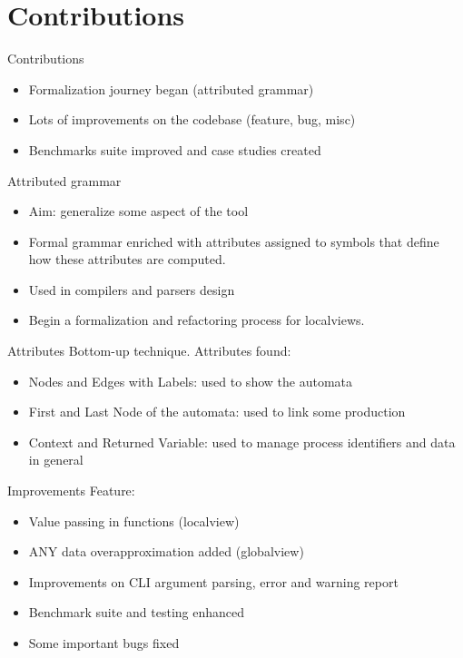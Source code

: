 \documentclass{beamer}
\begin{document}
\section{Contributions}
\begin{frame}{Contributions}
\begin{itemize}
    \item Formalization journey began (attributed grammar)
    \bigskip
    \item Lots of improvements on the codebase (feature, bug, misc)
    \bigskip
    \item Benchmarks suite improved and case studies created 
\end{itemize}
\end{frame}

\begin{frame}{Attributed grammar}
\begin{itemize}
    \item Aim: generalize some aspect of the tool
    \bigskip
    \item Formal grammar enriched with attributes assigned to symbols 
    that define how these attributes are computed.
    \bigskip
    \item Used in compilers and parsers design
    \bigskip
    \item Begin a formalization and refactoring process for localviews. 
\end{itemize}
\end{frame}


\begin{frame}[fragile]{Attributes}
Bottom-up technique. Attributes found:
\bigskip
\begin{itemize}
    \item Nodes and Edges with Labels: used to show the automata
    \bigskip
    \item First and Last Node of the automata: used to link some production 
    \bigskip
    \item Context and Returned Variable: used to manage process identifiers and data in general
\end{itemize}
\end{frame}


\begin{frame}{Improvements}
Feature:
\begin{itemize}
    \item Value passing in functions (localview)
    \bigskip
    \item ANY data overapproximation added (globalview)
    \bigskip
    \item Improvements on CLI argument parsing, error and warning report
    \bigskip
    \item Benchmark suite and testing enhanced 
    \bigskip
    \item Some important bugs fixed
\end{itemize}
\end{frame}
\end{document}
